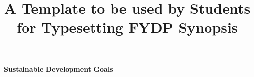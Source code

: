 \documentclass[a4paper, 11pt, oneside]{uet_thesis}  %
\begin{document}
\frontmatter	  %

\title  {A Template to be used by Students for Typesetting FYDP Synopsis %
}

\addresses  {\deptname \\ \univname}  %
\subject    {}
\keywords   {}

\maketitle


\fancyhead{}  %
\rhead{\thepage}  %
\lhead{}  %

\pagestyle{fancy}  %


\clearpage  %

\pagestyle{plain}  %

\begin{center}
	\huge{\bf Sustainable Development Goals} 
	\par
\end{center}

\vspace{0.5in}
\end{document}
